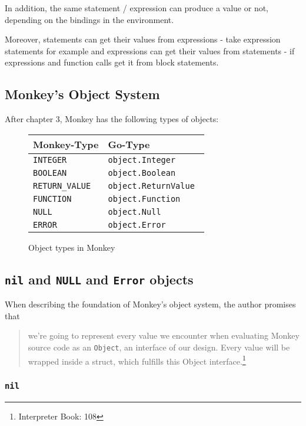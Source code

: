 \documentclass[a4paper,10pt]{article}
\begin{document}
In addition, the same statement / expression can produce a value or not, depending on the bindings in the environment.

Moreover, statements can get their values from expressions - take expression statements for example and expressions can get their values from statements - if expressions and function calls get it from block statements.

\newpage
\subsection{Monkey's Object System}

After chapter 3, Monkey has the following types of objects:
\begin{figure}[h]
\begin{center}
\begin{tabular}{|l|l|}
\hline 
Monkey-Type & Go-Type \\\hline 
\tt INTEGER & \tt object.Integer \\
\tt BOOLEAN & \tt object.Boolean \\
\tt RETURN\_VALUE & \tt object.ReturnValue \\
\tt FUNCTION & \tt object.Function \\
\tt NULL & \tt object.Null \\
\tt ERROR & \tt object.Error 
\\\hline
\end{tabular}
\end{center}
\caption{Object types in Monkey}
\end{figure}



\subsection{{\tt nil} and {\tt NULL} and {\tt Error} objects}

When describing the foundation of Monkey's object system, the author promises that

\begin{quote}
 we’re going to represent every value we encounter when evaluating Monkey source code as
an {\tt Object}, an interface of our design. Every value will be wrapped inside a struct, which fulfills
this Object interface.\footnote{Interpreter Book: 108}
\end{quote}

\subsubsection{\tt nil}
\end{document}
